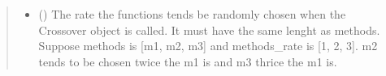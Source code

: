 \documentclass[letterpaper,10pt,english]{sphinxmanual}
\begin{document}
\begin{fulllineitems}
\begin{quote}
\begin{description}
\begin{itemize}
\item {} 
\sphinxAtStartPar
{} (\sphinxstyleliteralemphasis{\sphinxupquote{{[}}}\sphinxstyleliteralemphasis{\sphinxupquote{{]}}}) \textendash{} The rate the functions tends be randomly chosen when the Crossover object is called. It
must have the same lenght as methods. Suppose methods is {[}m1, m2, m3{]} and methods\_rate is  {[}1, 2, 3{]}. m2
tends to be chosen twice the m1 is and m3 thrice the m1 is.

\end{itemize}

\end{description}\end{quote}

\end{fulllineitems}

\end{document}
